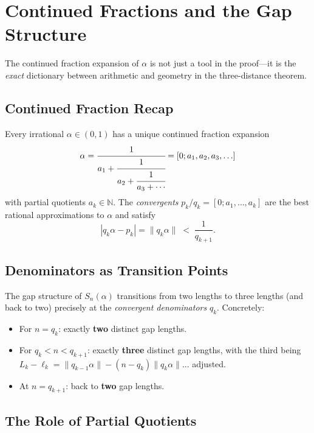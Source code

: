 \section{Continued Fractions and the Gap Structure}

The continued fraction expansion of $\alpha$ is not just a tool in the proof---it
is the \emph{exact} dictionary between arithmetic and geometry in the three-distance theorem.

\subsection*{Continued Fraction Recap}

Every irrational $\alpha \in (0,1)$ has a unique continued fraction expansion
\[
  \alpha = \cfrac{1}{a_1 + \cfrac{1}{a_2 + \cfrac{1}{a_3 + \cdots}}} = [0; a_1, a_2, a_3, \ldots]
\]
with partial quotients $a_k \in \mathbb{N}$.  The \emph{convergents} $p_k/q_k = [0; a_1, \ldots, a_k]$
are the best rational approximations to $\alpha$ and satisfy
\[
  |q_k \alpha - p_k| = \|q_k \alpha\| \;<\; \frac{1}{q_{k+1}}.
\]

\subsection*{Denominators as Transition Points}

\begin{theorem}
  The gap structure of $S_n(\alpha)$ transitions from two lengths to three lengths
  (and back to two) precisely at the \emph{convergent denominators} $q_k$.
  Concretely:
  \begin{itemize}
    \item For $n = q_k$: exactly \textbf{two} distinct gap lengths.
    \item For $q_k < n < q_{k+1}$: exactly \textbf{three} distinct gap lengths,
          with the third being $L_k - \ell_k = \|q_{k-1}\alpha\| - (n - q_k)\|q_k\alpha\|$... adjusted.
    \item At $n = q_{k+1}$: back to \textbf{two} gap lengths.
  \end{itemize}
\end{theorem}

\subsection*{The Role of Partial Quotients}


